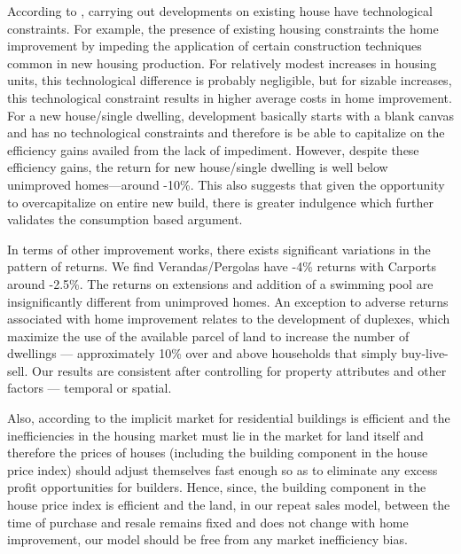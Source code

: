 \documentclass[AEJ,reqno, draftmode]{AEA} %
\begin{document}
According to \citet{potepan1989interest}, carrying out developments on existing house have technological constraints. For example, the presence of existing housing constraints the home improvement by impeding the application of certain construction techniques common in new housing production. For relatively modest increases in housing units, this technological difference is probably negligible, but for sizable increases, this technological constraint results in higher average costs in home improvement. For a new house/single dwelling, development basically starts with a blank canvas and has no technological constraints and therefore is be able to capitalize on the efficiency gains availed from the lack of impediment. However, despite these efficiency gains, the return for new house/single dwelling is well below unimproved homes---around -10\%. This also suggests that given the opportunity to overcapitalize on entire new build, there is greater indulgence which further validates the consumption based argument. 

In terms of other improvement works, there exists significant variations in the pattern of returns. We find Verandas/Pergolas have -4\% returns with Carports around -2.5\%. The returns on extensions and addition of a swimming pool are insignificantly different from unimproved homes. An exception to adverse returns associated with home improvement relates to the development of duplexes, which maximize the use of the available parcel of land to increase the number of dwellings --- approximately 10\% over and above households that simply buy-live-sell. Our results are consistent after controlling for property attributes and other factors --- temporal or spatial.

Also, according to \citet{rosenthal1999residential} the implicit market for residential buildings is efficient and the inefficiencies in the housing market must lie in the market for land itself and therefore the prices of houses (including the building component in the house price index) should adjust themselves fast enough so as to eliminate any excess profit opportunities for builders. Hence, since, the building component in the house price index is efficient and the land, in our repeat sales model, between the time of purchase and resale remains fixed and does not change with home improvement, our model should be free from any market inefficiency bias.
\end{document}
